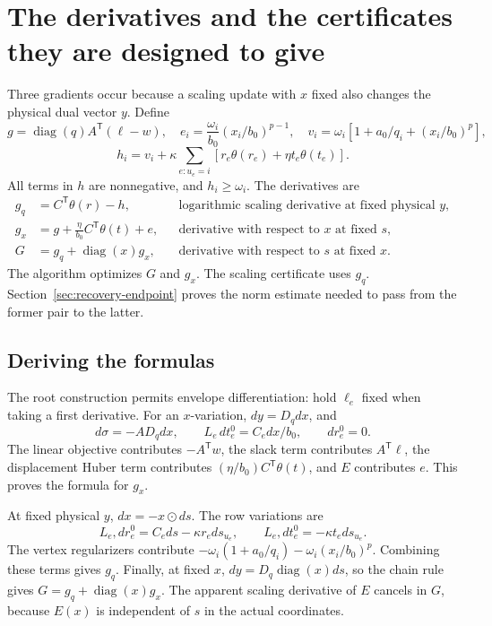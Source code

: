 \documentclass[11pt]{article}
\theoremstyle{definition}\newtheorem{definition}[theorem]{Definition}
\theoremstyle{remark}\newtheorem{remark}[theorem]{Remark}
\newcommand{\diag}{\operatorname{diag}}
\begin{document}
\section{The derivatives and the certificates they are designed to give}
\label{sec:gradients}

Three gradients occur because a scaling update with $x$ fixed also
changes the physical dual vector $y$. Define
\[
 g=\diag(q)A^{\mathsf T}(\ell-w),\quad
 e_i=\frac{\omega_i}{b_0}(x_i/b_0)^{p-1},\quad
 v_i=\omega_i[1+a_0/q_i+(x_i/b_0)^p],
\]
\[
 h_i=v_i+\kappa\sum_{e:u_e=i}
              [r_e\theta(r_e)+\eta t_e\theta(t_e)].
\]
All terms in $h$ are nonnegative, and $h_i\ge\omega_i$.
The derivatives are
\begin{align}\label{eq:gradients}
 g_q&=C^{\mathsf T}\theta(r)-h,
 &&\text{logarithmic scaling derivative at fixed physical }y,\\
 g_x&=g+\frac\eta{b_0}C^{\mathsf T}\theta(t)+e,
 &&\text{derivative with respect to }x\text{ at fixed }s,\nonumber\\
 G&=g_q+\diag(x)g_x,
 &&\text{derivative with respect to }s\text{ at fixed }x.\nonumber
\end{align}
The algorithm optimizes $G$ and $g_x$. The scaling certificate uses
$g_q$. Section~\ref{sec:recovery-endpoint} proves the norm estimate
needed to pass from the former pair to the latter.

\subsection{Deriving the formulas}

The root construction permits envelope differentiation: hold $\ell_e$
fixed when taking a first derivative. For an $x$-variation,
$dy=D_qdx$, and
\[
 d\sigma=-AD_qdx,\qquad
 L_e\,dt_e^0=C_e dx/b_0,\qquad d r_e^0=0.
\]
The linear objective contributes $-A^{\mathsf T}w$, the slack term
contributes $A^{\mathsf T}\ell$, the displacement Huber term contributes
$(\eta/b_0)C^{\mathsf T}\theta(t)$, and $E$ contributes $e$.
This proves the formula for $g_x$.

At fixed physical $y$, $dx=-x\odot ds$. The row variations are
\[
 L_e,dr_e^0=C_e ds-\kappa r_e ds_{u_e},\qquad
 L_e,dt_e^0=-\kappa t_e ds_{u_e}.
\]
The vertex regularizers contribute
$-\omega_i(1+a_0/q_i)-\omega_i(x_i/b_0)^p$.
Combining these terms gives $g_q$. Finally, at fixed $x$,
$dy=D_q\diag(x)ds$, so the chain rule gives
$G=g_q+\diag(x)g_x$. The apparent scaling derivative of $E$ cancels
in $G$, because $E(x)$ is independent of $s$ in the actual coordinates.
\end{document}
